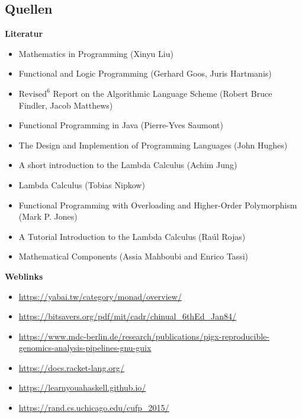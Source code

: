 \documentclass{beamer}
\begin{document}
\begin{frame}
	\section{Quellen}
	\fontsize{8pt}{10pt}
	\centering
	\textbf{Literatur}
	\begin{itemize}
    \item Mathematics in Programming (Xinyu Liu)
\item Functional and Logic Programming (Gerhard Goos, Juris Hartmanis)
\item $\text{Revised}^6$ Report on the Algorithmic Language
Scheme (Robert Bruce Findler, Jacob Matthews)
\item Functional Programming in Java (Pierre-Yves Saumont)
\item The Design and Implemention of Programming Languages (John Hughes)
\item A short introduction to the Lambda Calculus (Achim Jung)
\item Lambda Calculus (Tobias Nipkow) 
\item   Functional Programming with Overloading and
Higher-Order Polymorphism (Mark P. Jones)
\item A Tutorial Introduction to the Lambda Calculus (Raúl Rojas)
\item Mathematical Components (Assia Mahboubi and Enrico Tassi)
 \end{itemize}
 \textbf{Weblinks}
	\begin{itemize}
		\item \url{https://yabai.tw/category/monad/overview/}
        \item \url{https://bitsavers.org/pdf/mit/cadr/chinual_6thEd_Jan84/}
        \item \url{https://www.mdc-berlin.de/research/publications/pigx-reproducible-genomics-analysis-pipelines-gnu-guix}
        \item \url{https://docs.racket-lang.org/}
        \item \url{https://learnyouahaskell.github.io/}
        \item \url{https://rand.cs.uchicago.edu/cufp_2015/}
	\end{itemize}
 
\end{frame}
\end{document}
